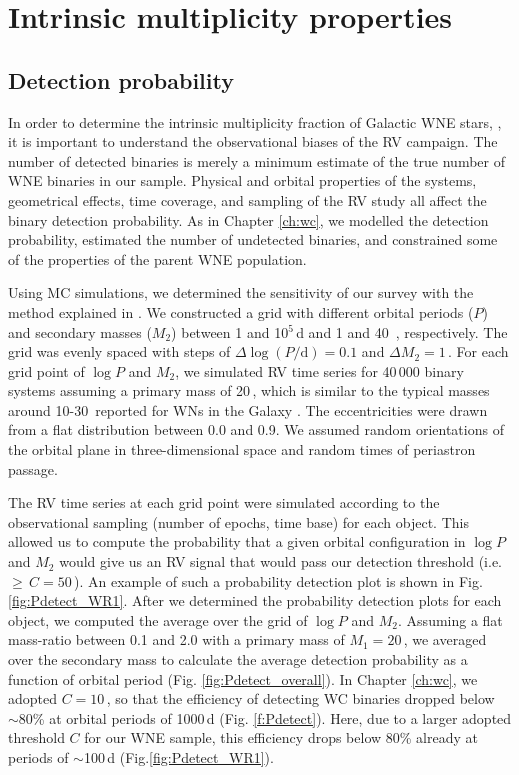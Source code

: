 \section{Intrinsic multiplicity properties}\label{sect:intbinfrac}
\subsection{Detection probability} \label{sect:detection_probability}
In order to determine the intrinsic multiplicity fraction of Galactic WNE stars, \fintWNE{}, it is important to understand the observational biases of the RV campaign. The number of detected binaries is merely a minimum estimate of the true number of  WNE binaries in our sample. Physical and orbital properties of the systems, geometrical effects, time coverage, and sampling of the RV study all affect the binary detection probability. As in Chapter \ref{ch:wc}, we modelled the detection probability, estimated the number of undetected binaries, and constrained some of the properties of the parent WNE population.

Using MC simulations, we determined the sensitivity of our survey with the method explained in \citet{2019Patrick}. We constructed a grid with different orbital periods ($P$) and secondary masses ($M_2$) between 1 and 10$^5$\,d and 1 and 40\,\Msun{} , respectively. The grid was evenly spaced with steps of $\Delta \log (P/\textrm{d}) = 0.1$ and $\Delta M_2 = 1$\,\Msun{}. For each grid point of $\log P$ and $M_2$, we simulated RV time series for 40\,000 binary systems assuming a primary mass of 20\,\Msun{}, which is similar to the typical masses around 10-30\,\Msun{} reported for WNs in the Galaxy \citep{hamann_galactic_2019}. The eccentricities were drawn from a flat distribution between 0.0 and 0.9. We assumed random orientations of the orbital plane in three-dimensional space and random times of periastron passage.

The RV time series at each grid point were simulated according to the observational sampling (number of epochs, time base) for each object. This allowed us to compute the probability that a given orbital configuration in $\log P$ and $M_2$ would give us an RV signal that would pass our detection threshold (i.e. \DelRV{}\,$\ge\,C=50$\,\kms{}). An example of such a probability detection plot is shown in Fig. \ref{fig:Pdetect_WR1}. After we determined the probability detection plots for each object, we computed the average over the grid of $\log P$ and $M_2$. Assuming a flat mass-ratio between 0.1 and 2.0 with a primary mass of $M_1 = 20$\,\Msun{}, we averaged over the secondary mass to calculate the average detection probability as a function of orbital period (Fig. \ref{fig:Pdetect_overall}). In Chapter \ref{ch:wc}, we adopted $C=10\,$\kms{}, so that the efficiency of detecting WC binaries dropped below ${\sim}80$\% at orbital periods of 1000\,d (Fig. \ref{f:Pdetect}). Here, due to a larger adopted threshold $C$ for our WNE sample, this efficiency drops below 80\% already at periods of ${\sim}$100\,d (Fig.\ref{fig:Pdetect_WR1}).

